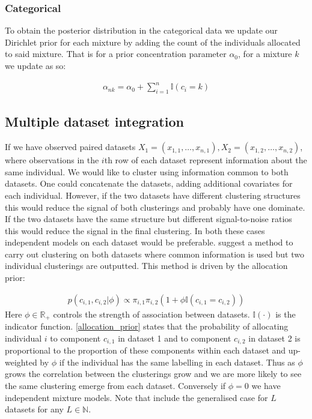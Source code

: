 \documentclass[11pt]{article} %
\begin{document}
\subsubsection{Categorical}
To obtain the posterior distribution in the categorical data we update our Dirichlet prior for each mixture by adding the count of the individuals allocated to said mixture. That is for a prior concentration parameter $\alpha_0$, for a mixture $k$ we update as so:

\begin{align}
\alpha_{nk} = \alpha_0 + \sum_{i=1}^n \mathbb{I}(c_i = k)
\end{align}

\subsection{Multiple dataset integration}
If we have observed paired datasets $X_1 = (x_{1,1},\ldots,x_{n,1}), X_2 = (x_{1,2},\ldots,x_{n,2})$, where observations in the $i$th row of each dataset represent information about the same individual. We would like to cluster using information common to both datasets. One could concatenate the datasets, adding additional covariates for each individual. However, if the two datasets have different clustering structures this would reduce the signal of both clusterings and probably have one dominate. If the two datasets have the same structure but different signal-to-noise ratios this would reduce the signal in the final clustering. In both these cases independent models on each dataset would be preferable. \citet{kirkBayesianCorrelatedClustering2012} suggest a method to carry out clustering on both datasets where common information is used but two individual clusterings are outputted. This method is driven by the allocation prior:

\begin{align} \label{allocation_prior}
p(c_{i,1}, c_{i,2} | \phi ) \propto \pi_{i,1} \pi_{i,2} (1 + \phi \mathbb{I}(c_{i,1} = c_{i,2}))
\end{align}
Here $\phi \in \mathbb{R}_+$ controls the strength of association between datasets. $\mathbb{I}(\cdot)$ is the indicator function. \eqref{allocation_prior} states that the probability of allocating individual $i$ to component $c_{i,1}$ in dataset 1 and to component $c_{i,2}$ in dataset 2 is proportional to the proportion of these components within each dataset and up-weighted by $\phi$ if the individual has the same labelling in each dataset. Thus as $\phi$ grows the correlation between the clusterings grow and we are more likely to see the same clustering emerge from each dataset. Conversely if $\phi = 0$ we have independent mixture models. Note that \citet{kirkBayesianCorrelatedClustering2012} include the generalised case for $L$ datasets for any $L \in \mathbb{N}$.
\end{document}
